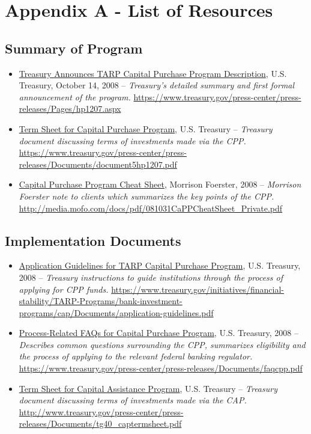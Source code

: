 \documentclass[12pt]{article}
\begin{document}
\newpage
{}


\nocite{*}


\newpage
\section{Appendix A - List of Resources}

\subsection{Summary of Program}

\begin{itemize}
\item
\ul{Treasury Announces TARP Capital Purchase Program Description}, U.S. Treasury, October 14, 2008 -- \emph{Treasury's detailed summary and first formal announcement of the program.} \url{https://www.treasury.gov/press-center/press-releases/Pages/hp1207.aspx}

\item
\ul{Term
 Sheet for Capital Purchase Program}, U.S. Treasury -- \emph{Treasury
 document discussing terms of investments made via the CPP.} \url{https://www.treasury.gov/press-center/press-releases/Documents/document5hp1207.pdf}

 \item
\ul{Capital Purchase Program Cheat Sheet}, Morrison Foerster, 2008 -- \emph{Morrison Foerster note to clients which summarizes the key points of the CPP.} \url{http://media.mofo.com/docs/pdf/081031CaPPCheatSheet_Private.pdf}


\end{itemize}

\subsection{Implementation Documents}
\begin{itemize}
\item
\ul{Application Guidelines for TARP Capital Purchase Program},
 U.S. Treasury, 2008 -- \emph{Treasury instructions to guide institutions through the process of applying for CPP funds.} \url{https://www.treasury.gov/initiatives/financial-stability/TARP-Programs/bank-investment-programs/cap/Documents/application-guidelines.pdf}
 \item
\ul{Process-Related FAQs for Capital Purchase Program},
 U.S. Treasury, 2008 -- \emph{Describes common questions surrounding the CPP, summarizes eligibility and the process of applying to the relevant federal banking regulator.} \url{https://www.treasury.gov/press-center/press-releases/Documents/faqcpp.pdf}
 \item
\ul{Term
 Sheet for Capital Assistance Program}, U.S. Treasury -- \emph{Treasury
 document discussing terms of investments made via the CAP.} \url{http://www.treasury.gov/press-center/press-releases/Documents/tg40_captermsheet.pdf}

\end{itemize}
\end{document}
